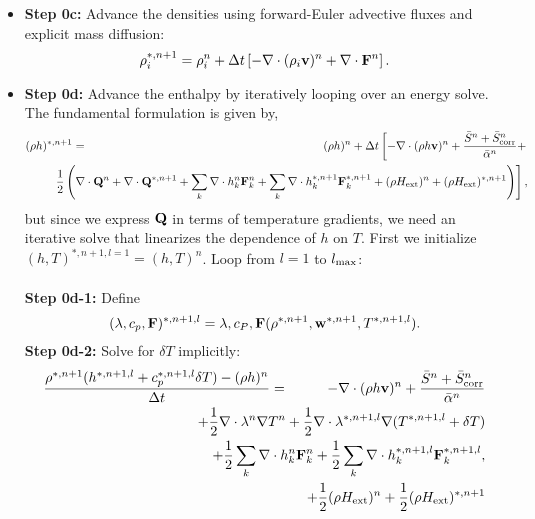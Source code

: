 \documentclass[final]{siamltex}
\def\Fb {{\bf F}}
\def\Qb {{\bf Q}}
\def\vb {{\bf v}}
\def\wb {{\bf w}}
\def\Hext {H_{\rm ext}}
\def\half   {\frac{1}{2}}
\begin{document}
\begin{itemize}
\item {\bf Step 0c:} Advance the densities using forward-Euler advective fluxes
and explicit mass diffusion:
\begin{equation}
\rho_i^{*,n+1} = \rho_i^n + \Delta t\left[-\nabla\cdot(\rho_i\vb)^n + \nabla\cdot\Fb^n\right].
\end{equation}
\item {\bf Step 0d:} Advance the enthalpy by iteratively looping over an energy solve.
The fundamental formulation is given by,
\begin{eqnarray}
(\rho h)^{*,n+1} &=& (\rho h)^n + \Delta t\left[-\nabla\cdot(\rho h\vb)^n + \frac{\bar{S}^n + \bar{S}_{\rm corr}^n}{\bar{\alpha}^n} + \right.\nonumber\\
&&\hspace{-0.5in}\left.\frac{1}{2}\left(\nabla\cdot\Qb^n + \nabla\cdot\Qb^{*,n+1} + \sum_k\nabla\cdot h_k^n\Fb_k^n + \sum_k\nabla\cdot h_k^{*,n+1}\Fb_k^{*,n+1} + (\rho\Hext)^n + (\rho\Hext)^{*,n+1}\right)\right],\nonumber\\
\end{eqnarray}
but since we express $\Qb$ in terms of temperature gradients, we need an iterative
solve that linearizes the dependence of $h$ on $T$.  First we initialize
$(h,T)^{*,n+1,l=1} = (h,T)^n$.
Loop from $l=1$ to $l_{\rm max}$:\\ \\
{\bf Step 0d-1:} Define
\begin{equation}
(\lambda,c_p,\Fb)^{*,n+1,l} = \lambda,c_P,\Fb(\rho^{*,n+1},\wb^{*,n+1},T^{*,n+1,l}).
\end{equation}
{\bf Step 0d-2:} Solve for $\delta T$ implicitly:
\begin{eqnarray}
\frac{\rho^{*,n+1}(h^{*,n+1,l} + c_p^{*,n+1,l}\delta T) - (\rho h)^n}{\Delta t} &=&
-\nabla\cdot(\rho h\vb)^n + \frac{\bar{S}^n + \bar{S}_{\rm corr}^n}{\bar{\alpha}^n} \nonumber\\
&&\hspace{-1in} + \half\nabla\cdot\lambda^n\nabla T^n + \half\nabla\cdot\lambda^{*,n+1,l}\nabla(T^{*,n+1,l} + \delta T)\nonumber\\
&&\hspace{-1in} + \half\sum_k\nabla\cdot h_k^n \Fb_k^n + \half\sum_k\nabla\cdot h_k^{*,n+1,l} \Fb_k^{*,n+1,l},\nonumber\\
&&\hspace{-1in} + \half(\rho\Hext)^n + \half(\rho\Hext)^{*,n+1}
\end{eqnarray}
\begin{eqnarray}

\end{eqnarray}
\end{itemize}
\end{document}
